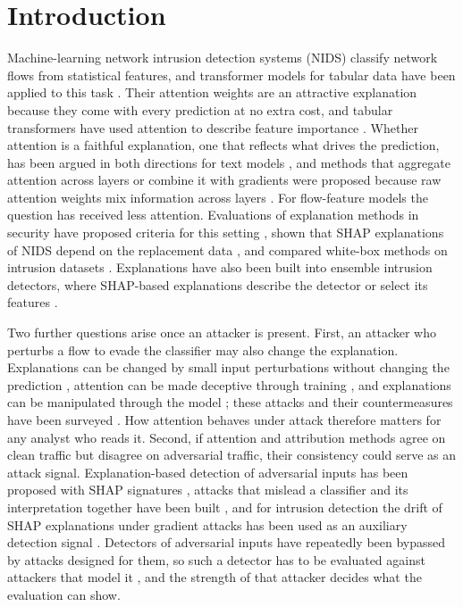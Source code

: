 \section*{Introduction}
\label{sec:intro}

Machine-learning network intrusion detection systems (NIDS) classify network flows from statistical features, and
transformer models for tabular data have been applied to this task \cite{gorishniy2021,manocchio2024,borisov2024}.
Their attention weights are an attractive explanation because they come with every prediction at no extra cost, and
tabular transformers have used attention to describe feature importance \cite{arik2021,gorishniy2021,somepalli2021}.
Whether attention is a faithful explanation, one that reflects what drives the prediction, has been argued in both
directions for text models \cite{jain2019,wiegreffe2019,serrano2019,jacovi2020}, and methods that aggregate attention
across layers or combine it with gradients were proposed because raw attention weights mix information across layers
\cite{abnar2020,chefer2021,ferrando2022}.
For flow-feature models the question has received less attention.
Evaluations of explanation methods in security have proposed criteria for this setting \cite{warnecke2020}, shown
that SHAP explanations of NIDS depend on the replacement data \cite{tritscher2023}, and compared white-box methods on
intrusion datasets \cite{arreche2025}.
Explanations have also been built into ensemble intrusion detectors, where SHAP-based explanations describe the
detector or select its features \cite{ahmed2024haenid,ahmed2024shap,ahmed2025consensus,ahmed2025hcivad}.

Two further questions arise once an attacker is present.
First, an attacker who perturbs a flow to evade the classifier may also change the explanation.
Explanations can be changed by small input perturbations without changing the prediction
\cite{ghorbani2019,dombrowski2019}, attention can be made deceptive through training \cite{pruthi2020}, and
explanations can be manipulated through the model \cite{heo2019,slack2020}; these attacks and their countermeasures
have been surveyed \cite{baniecki2024}.
How attention behaves under attack therefore matters for any analyst who reads it.
Second, if attention and attribution methods agree on clean traffic but disagree on adversarial traffic, their
consistency could serve as an attack signal.
Explanation-based detection of adversarial inputs has been proposed with SHAP signatures \cite{fidel2020}, attacks that
mislead a classifier and its interpretation together have been built \cite{zhang2020}, and for intrusion detection the
drift of SHAP explanations under gradient attacks has been used as an auxiliary detection signal \cite{maseno2026}.
Detectors of adversarial inputs have repeatedly been bypassed by attacks designed for them, so such a detector has to
be evaluated against attackers that model it \cite{carlini2017,tramer2020}, and the strength of that attacker decides
what the evaluation can show.


